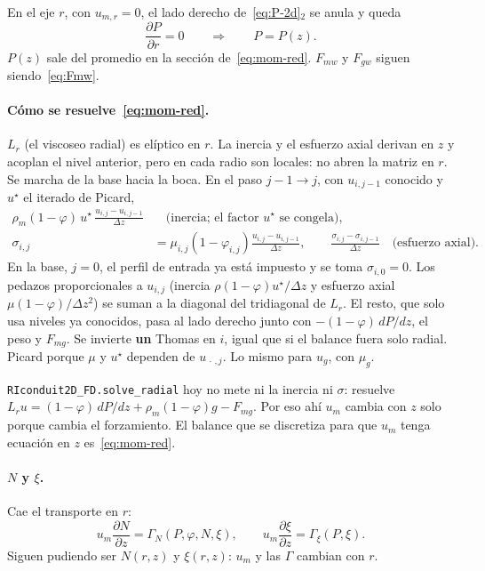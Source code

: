 \documentclass[11pt,a4paper]{article}
\newcommand{\p}{\partial}
\begin{document}
En el eje $r$, con $u_{m,r}=0$, el lado derecho
de~\eqref{eq:P-2d}$_2$ se anula y queda
\begin{equation}
\label{eq:P-red}
\frac{\p P}{\p r}=0
\qquad\Rightarrow\qquad
P=P(z).
\end{equation}
$P(z)$ sale del promedio en la sección
de~\eqref{eq:mom-red}. $F_{mw}$ y $F_{gw}$ siguen
siendo~\eqref{eq:Fmw}.

\paragraph{Cómo se resuelve~\eqref{eq:mom-red}.}
$L_r$ (el viscoseo radial) es elíptico en $r$. La inercia
y el esfuerzo axial derivan en $z$ y acoplan el nivel
anterior, pero en cada radio son locales: no abren la
matriz en $r$. Se marcha de la base hacia la boca. En el
paso $j-1\to j$, con $u_{i,j-1}$ conocido y $u^\star$ el
iterado de Picard,
\begin{align}
\label{eq:inercia-axial}
\rho_m(1-\varphi)\,u^\star\,
\frac{u_{i,j}-u_{i,j-1}}{\Delta z}
&\quad\text{(inercia; el factor $u^\star$ se congela),}
\\
\sigma_{i,j}
&=\mu_{i,j}(1-\varphi_{i,j})
\frac{u_{i,j}-u_{i,j-1}}{\Delta z},
\qquad
\frac{\sigma_{i,j}-\sigma_{i,j-1}}{\Delta z}
\quad\text{(esfuerzo axial).}
\end{align}
En la base, $j=0$, el perfil de entrada ya está impuesto y
se toma $\sigma_{i,0}=0$. Los pedazos proporcionales a
$u_{i,j}$ (inercia $\rho(1-\varphi)u^\star/\Delta z$ y
esfuerzo axial $\mu(1-\varphi)/\Delta z^2$) se suman a la
diagonal del tridiagonal de $L_r$. El resto, que solo usa
niveles ya conocidos, pasa al lado derecho junto con
$-(1-\varphi)\,dP/dz$, el peso y $F_{mg}$. Se invierte
\textbf{un} Thomas en $i$, igual que si el balance fuera
solo radial. Picard porque $\mu$ y $u^\star$ dependen de
$u_{\,\cdot\,,j}$. Lo mismo para $u_g$, con $\mu_g$.

\texttt{RIconduit2D\_FD.solve\_radial} hoy no mete ni la
inercia ni $\sigma$: resuelve
$L_r u=(1-\varphi)\,dP/dz+\rho_m(1-\varphi)g-F_{mg}$.
Por eso ahí $u_m$ cambia con $z$ solo porque cambia el
forzamiento. El balance que se discretiza para que $u_m$
tenga ecuación en $z$ es~\eqref{eq:mom-red}.

\paragraph{$N$ y $\xi$.}
Cae el transporte en $r$:
\begin{equation}
\label{eq:Nxi-red}
u_m\frac{\p N}{\p z}
=\Gamma_N(P,\varphi,N,\xi),
\qquad
u_m\frac{\p \xi}{\p z}
=\Gamma_\xi(P,\xi).
\end{equation}
Siguen pudiendo ser $N(r,z)$ y $\xi(r,z)$: $u_m$ y las
$\Gamma$ cambian con $r$.
\end{document}
